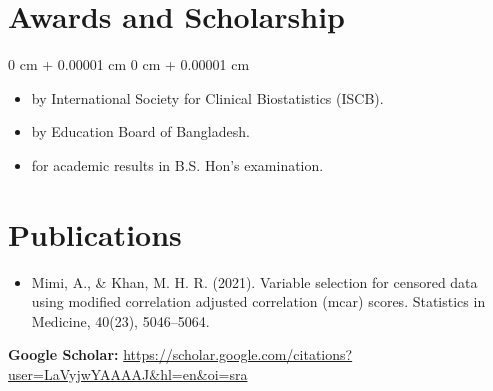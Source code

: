 \documentclass[10pt, letterpaper]{article}
\newenvironment{highlights}{
    \begin{itemize}[
        topsep=0.10 cm,
        parsep=0.10 cm,
        partopsep=0pt,
        itemsep=0pt,
        leftmargin=0 cm + 10pt
    ]
}{
    \end{itemize}
} %
\newenvironment{onecolentry}{
    \begin{adjustwidth}{
        0 cm + 0.00001 cm
    }{
        0 cm + 0.00001 cm
    }
}{
    \end{adjustwidth}
} %
\begin{document}
     \vspace{0.2 cm}
    \section{Awards and Scholarship}
        \vspace{0.10 cm}
        \begin{onecolentry}
            \begin{highlights}
                \item {} by International Society for Clinical Biostatistics (ISCB). %
                \item {} by Education Board of Bangladesh. %
                \item {} for academic results in B.S. Hon’s examination.
            \end{highlights}
        \end{onecolentry}


    \section{Publications}
        
        \begin{samepage}
        \begin{itemize}
            \item Mimi, A., \& Khan, M. H. R. (2021). Variable selection for censored data using modified correlation adjusted correlation (mcar) scores. Statistics in Medicine, 40(23), 5046–5064.     
           

        \end{itemize}
        \textbf{Google Scholar:} \href{https://scholar.google.com/citations?user=LaVyjwYAAAAJ&hl=en&oi=sra}{https://scholar.google.com/citations?user=LaVyjwYAAAAJ\&hl=en\&oi=sra}
         \end{samepage}
\end{document}
